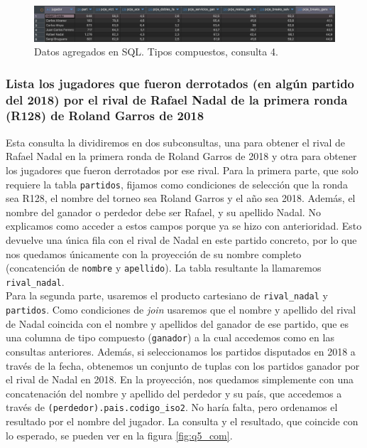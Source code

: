 \begin{figure}[H]
\centering
\includegraphics[width=\textwidth]{fotos/q4_com.png}
\caption{Datos agregados en SQL. Tipos compuestos, consulta 4.}
\label{fig:q4_com}
\end{figure}





\subsubsection{Lista los jugadores que fueron derrotados (en algún partido del 2018) por el rival de Rafael Nadal de la primera ronda (R128) de Roland Garros de 2018}

Esta consulta la dividiremos en dos subconsultas, una para obtener el rival de Rafael Nadal en la primera ronda de Roland Garros de 2018 y otra para obtener los jugadores que fueron derrotados por ese rival. Para la primera parte, que solo requiere la tabla \texttt{partidos}, fijamos como condiciones de selección que la ronda sea R128, el nombre del torneo sea Roland Garros y el año sea 2018. Además, el nombre del ganador o perdedor debe ser Rafael, y su apellido Nadal. No explicamos como acceder a estos campos porque ya se hizo con anterioridad. Esto devuelve una única fila con el rival de Nadal en este partido concreto, por lo que nos quedamos únicamente con la proyección de su nombre completo (concatención de \texttt{nombre} y \texttt{apellido}). La tabla resultante la llamaremos \texttt{rival\_nadal}. \\

Para la segunda parte, usaremos el producto cartesiano de \texttt{rival\_nadal} y \texttt{partidos}. Como condiciones de \textit{join} usaremos que el nombre y apellido del rival de Nadal coincida con el nombre y apellidos del ganador de ese partido, que es una columna de tipo compuesto (\texttt{ganador}) a la cual accedemos como en las consultas anteriores. Además, si seleccionamos los partidos disputados en 2018 a través de la fecha, obtenemos un conjunto de tuplas con los partidos ganador por el rival de Nadal en 2018. En la proyección, nos quedamos simplemente con una concatenación del nombre y apellido del perdedor y su país, que accedemos a través de \texttt{(perdedor).pais.codigo\_iso2}. No haría falta, pero ordenamos el resultado por el nombre del jugador. La consulta y el resultado, que coincide con lo esperado, se pueden ver en la figura \ref{fig:q5_com}.

